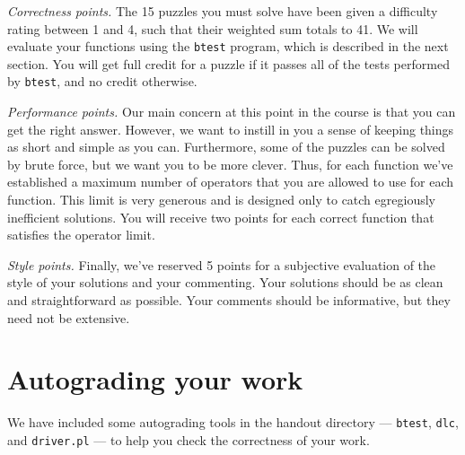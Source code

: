 \documentclass[11pt]{article}
\begin{document}
{\em Correctness points.} The 15 puzzles you must solve have been given a
difficulty rating between 1 and 4, such that their weighted sum totals
to 41.  We will evaluate your functions using the \texttt{btest}
program, which is described in the next section.  You will get full
credit for a puzzle if it passes all of the tests performed by
\texttt{btest}, and no credit otherwise.

{\em Performance points.}  Our main concern at this point in the course is
that you can get the right answer.  However, we want to instill in you
a sense of keeping things as short and simple as you can.
Furthermore, some of the puzzles can be solved by brute force, but we
want you to be more clever.  Thus, for each function we've established
a maximum number of operators that you are allowed to use for each
function. This limit is very generous and is designed only to catch
egregiously inefficient solutions.  You will receive two points for
each correct function that satisfies the operator limit.

{\em Style points.} Finally, we've reserved 5 points for a subjective
evaluation of the style of your solutions and your commenting.  Your
solutions should be as clean and straightforward as possible.  Your
comments should be informative, but they need not be extensive.

\section*{Autograding your work}

We have included some autograding tools in the handout directory ---
\texttt{btest}, \texttt{dlc}, and \texttt{driver.pl} --- to help you
check the correctness of your work.
\end{document}
